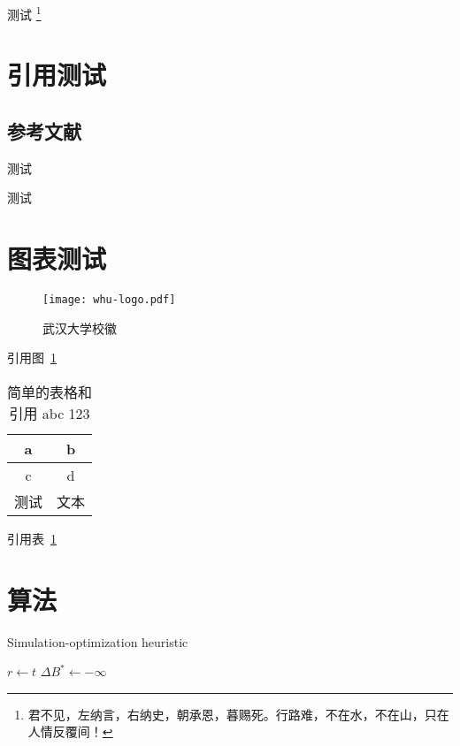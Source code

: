 测试 \footnote[3]{君不见，左纳言，右纳史，朝承恩，暮赐死。行路难，不在水，不在山，只在人情反覆间！}


\section{引用测试}

\subsection{参考文献}

测试 \cite{whu-bachelor:1,whu-bachelor:2,whu-bachelor:3,whu-bachelor:5,whu-bachelor:7}

测试 \cite*{whu-bachelor:1,whu-bachelor:2,whu-bachelor:3,whu-bachelor:7}



\section{图表测试}

\begin{figure}[ht]
  \centering
  \texttt{[image: whu-logo.pdf]}
  \caption{武汉大学校徽}
  \label{fig:武汉大学校徽}
\end{figure}

引用图~\ref{fig:武汉大学校徽}

\begin{table}[ht]
  \centering
  \caption{%
    简单的表格和引用 abc 123 %
  }
  \label{table:简单的表格}
  \begin{tabular}{cc}
    \hline
    a & b \\ \hline
    c & d \\ \hline
    测试 & 文本 \\ \hline
  \end{tabular}
\end{table}

引用表~\ref{table:简单的表格}


\section{算法}

\begin{algorithm}
\caption{Simulation-optimization heuristic}\label{algorithm}
$r\leftarrow t$\;
$\Delta B^{\ast}\leftarrow -\infty$\;
\end{algorithm}

